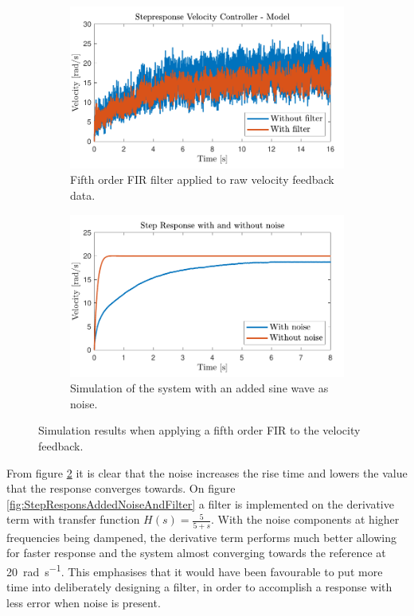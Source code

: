 \documentclass[../../main.tex]{subfiles}
\begin{document}
\begin{figure}[H]
     \centering
     \begin{subfigure}[b]{0.49\textwidth}
         \centering
    \includegraphics[width=\textwidth]{Sections/Miscellaneous/Images/FilteredStepRespons5Order.pdf}
    \caption{Fifth order FIR filter applied to raw velocity feedback data.}
    \label{fig:FilteredStepRespons5Order}
     \end{subfigure}
     \hfill
     \begin{subfigure}[b]{0.49\textwidth}
         \centering
         \includegraphics[width=\textwidth]{Sections/Miscellaneous/Images/StepResponsAddedNoise.pdf}
         \caption{Simulation of the system with an added sine wave as noise.}
         \label{fig:StepResponsAddedNoise}
     \end{subfigure}
        \caption{Simulation results when applying a fifth order FIR to the velocity feedback.}
        \label{fig:FilterDiskussionImplementedFilter}
\end{figure}
From figure \ref{fig:StepResponsAddedNoise} it is clear that the noise increases the rise time and lowers the value that the response converges towards. On figure \ref{fig:StepResponsAddedNoiseAndFilter} a filter is implemented on the derivative term with transfer function $H(s) = \frac{5}{5+s}$. With the noise components at higher frequencies being dampened, the derivative term performs much better allowing for faster response and the system almost converging towards the reference at \SI{20}{\radian \per \second}. This emphasises that it would have been favourable to put more time into deliberately designing a filter, in order to accomplish a response with less error when noise is present.
\end{document}
